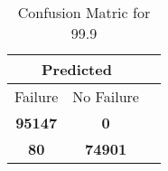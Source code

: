 \begin{table}[] 
\caption{Confusion Matric for 99.9} 
\label{Table: Prediction Accuracy-DMD99.9OnlySunEKF-combinationReflectionperfectNoFailurePrediction-Reflection} 
\centering 
\begin{tabular} 
 {@{}ccc@{}} 
\toprule 
\multicolumn{2}{c}{\textbf{Predicted}}
 \\ \midrule 
\multicolumn{1}{|c|}{Failure} & 
\multicolumn{1}{c|}{No Failure}
 \\ \midrule 
\multicolumn{1}{|c|}{\color{green}\textbf{95147}} & 
\multicolumn{1}{c|}{\color{red}\textbf{0}}
 \\ \midrule 
\multicolumn{1}{|c|}{\color{red}\textbf{80}} & 
\multicolumn{1}{c|}{\color{green}\textbf{74901}}
 \\ \bottomrule 
\end{tabular} 
\end{table} 
